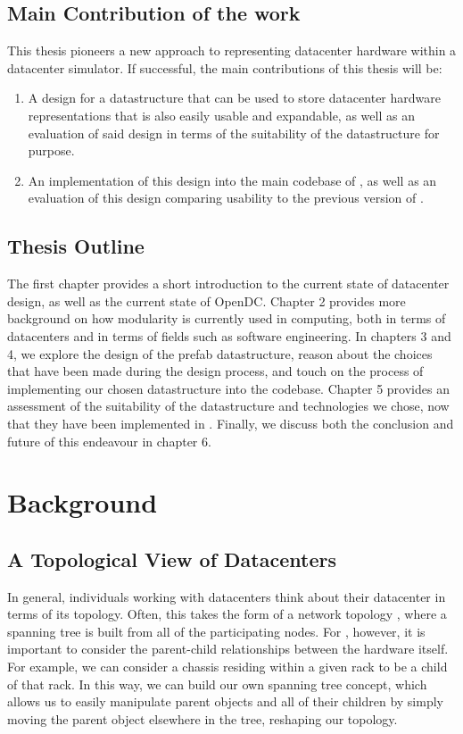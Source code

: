 \documentclass[11pt]{article}
\begin{document}
	\subsection{Main Contribution of the work}
		This thesis pioneers a new approach to representing datacenter hardware within a datacenter simulator.
		If successful, the main contributions of this thesis will be:
		\begin{enumerate}
			\item A design for a datastructure that can be used to store datacenter hardware representations that is also easily usable and expandable, as well as an evaluation of said design in terms of the suitability of the datastructure for purpose.
			\item An implementation of this design into the main codebase of \opendc{}, as well as an evaluation of this design comparing usability to the previous version of \opendc{}.
		\end{enumerate}
	\subsection{Thesis Outline}
		The first chapter provides a short introduction to the current state of datacenter design, as well as the current state of OpenDC. 
		Chapter 2 provides more background on how modularity is currently used in computing, both in terms of datacenters and in terms of fields such as software engineering. 
		In chapters 3 and 4, we explore the design of the prefab datastructure, reason about the choices that have been made during the design process, and touch on the process of implementing our chosen datastructure into the \opendc{} codebase.
		Chapter 5 provides an assessment of the suitability of the datastructure and technologies we chose, now that they have been implemented in \opendc{}.
		Finally, we discuss both the conclusion and future of this endeavour in chapter 6.
	

	

\newpage

\section{Background} \label{sec:background}

	\subsection{A Topological View of Datacenters}
		In general, individuals working with datacenters think about their datacenter in terms of its topology. 
		Often, this takes the form of a network topology \cite{Couto2012}, where a spanning tree is built from all of the participating nodes. 
		For \opendc{}, however, it is important to consider the parent-child relationships between the hardware itself. 
		For example, we can consider a chassis residing within a given rack to be a child of that rack.
		In this way, we can build our own spanning tree concept, which allows us to easily manipulate parent objects and all of their children by simply moving the parent object elsewhere in the tree, reshaping our topology.
\end{document}
